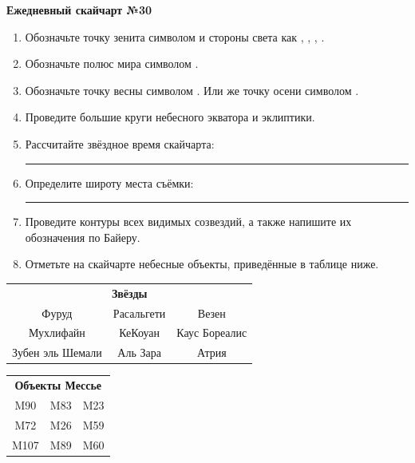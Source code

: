 \documentclass{./SAS-class-skygen}
\begin{document}
    
    
    
	\begin{center}
		\large\textbf{Ежедневный скайчарт №30}
	\end{center}

	\begin{enumerate}
		\item Обозначьте точку зенита символом  и стороны света как , , , .
		\item Обозначьте полюс мира символом .
		\item Обозначьте точку весны символом \Aries. Или же точку осени символом \Libra.
		\item Проведите большие круги небесного экватора и эклиптики.
		\item Рассчитайте звёздное время скайчарта: \rule{2cm}{0.4pt}
		\item Определите широту места съёмки: \rule{2cm}{0.4pt}
		\item Проведите контуры всех видимых созвездий, а также напишите их обозначения по Байеру.
		\item Отметьте на скайчарте небесные объекты, приведённые в таблице ниже.
	\end{enumerate}
	
    \vspace{0.5cm}

    \begin{table}[h!]
    \centering
    \begin{tabular}{ccc}
    \multicolumn{3}{c}{\textbf{Звёзды}} \\ Фуруд & Расальгети & Везен \\
Мухлифайн & КеКоуан & Каус Бореалис \\
Зубен эль Шемали & Аль Зара & Атрия \\

\end{tabular}
    \hfill
    \begin{tabular}{ccc}
    \multicolumn{3}{c}{\textbf{Объекты Мессье}} \\ M90 & M83 & M23 \\
M72 & M26 & M59 \\
M107 & M89 & M60 \\

\end{tabular}
    \end{table}
	
\end{document}
